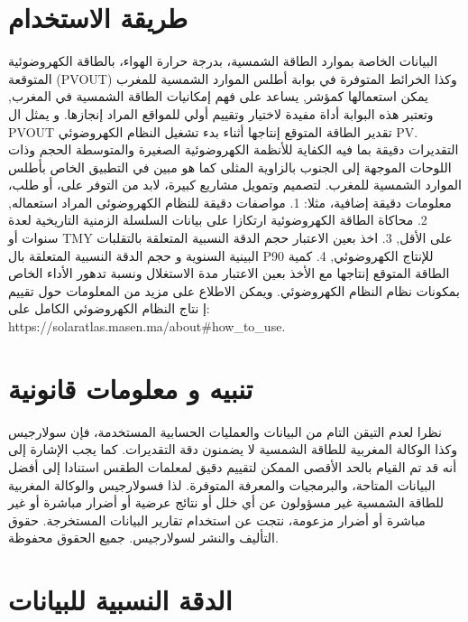 \documentclass[11pt,a4paper]{article}
\begin{document}
\section{ طريقة الاستخدام }

البيانات الخاصة بموارد الطاقة الشمسية، بدرجة حرارة الهواء، بالطاقة 
الكهروضوئية المتوقعة (PVOUT) وكذا الخرائط المتوفرة في بوابة أطلس الموارد الشمسية 
للمغرب  يمكن استعمالها كمؤشر, يساعد على فهم إمكانيات الطاقة الشمسية في المغرب,
وتعتبر هذه البوابة أداة مفيدة لاختيار وتقييم أولي للمواقع المراد إنجازها. و يمثل
ال PVOUT تقدير الطاقة   المتوقع إنتاجها أثناء بدء  تشغيل  النظام الكهروضوئي PV. 
التقديرات دقيقة بما فيه الكفاية للأنظمة الكهروضوئية الصغيرة والمتوسطة الحجم وذات 
اللوحات الموجهة إلى الجنوب بالزاوية المثلى كما هو مبين في التطبيق الخاص بأطلس 
الموارد الشمسية للمغرب.   لتصميم وتمويل مشاريع كبيرة، لابد من التوفر على، أو طلب،
معلومات دقيقة إضافية، مثلا: 1. مواصفات دقيقة للنظام الكھروضوئی المراد استعماله, 2.
محاكاة الطاقة الكهروضوئية ارتكازا على بيانات السلسلة الزمنية التاريخية لعدة سنوات
أو TMY على الأقل, 3. اخذ بعين الاعتبار  حجم الدقة النسبية المتعلقة بالتقلبات 
البينية السنوية و حجم الدقة النسبية المتعلقة بال P90 للإنتاج الكهروضوئي, 4. 
كمية الطاقة المتوقع إنتاجها مع الأخذ بعين الاعتبار مدة الاستغلال ونسبة تدهور الأداء
الخاص بمكونات نظام النظام الكهروضوئي. ويمكن الاطلاع على مزيد من المعلومات حول تقييم إ
نتاج النظام الكهروضوئي الكامل على: https://solaratlas.masen.ma/about\#how\_to\_use.

\section{ تنبيه  و معلومات  قانونية }

\begin{Arabic}
نظرا لعدم التيقن التام من البيانات والعمليات الحسابية المستخدمة، فإن سولارجيس وكذا الوكالة 
المغربية للطاقة الشمسية لا يضمنون دقة التقديرات. كما يجب الإشارة إلى أنه قد تم القيام 
بالحد الأقصى الممكن لتقييم دقيق لمعلمات الطقس استنادا إلى أفضل البيانات المتاحة،
والبرمجيات والمعرفة المتوفرة. لذا فسولارجيس والوكالة المغربية للطاقة الشمسية غير مسؤولون 
عن أي خلل أو نتائج عرضية أو أضرار مباشرة أو غير مباشرة أو أضرار مزعومة، نتجت عن 
استخدام تقارير البيانات المستخرجة. حقوق التأليف والنشر لسولارجيس. جميع الحقوق محفوظة.
\end{Arabic}

\section{ الدقة النسبية  للبيانات }
\end{document}
